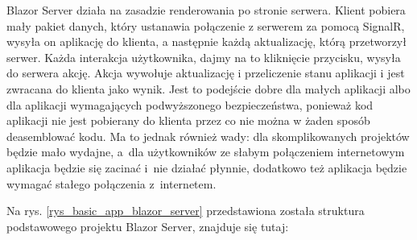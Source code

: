 \documentclass[12pt,a4paper,oneside]{book}
\begin{document}
Blazor Server działa na zasadzie renderowania po stronie serwera. Klient pobiera mały pakiet danych, który ustanawia połączenie z serwerem za pomocą SignalR, wysyła on aplikację do klienta, a następnie każdą aktualizację, którą przetworzył serwer. Każda interakcja użytkownika, dajmy na to kliknięcie przycisku, wysyła do serwera akcję. Akcja wywołuje aktualizację i przeliczenie stanu aplikacji i jest zwracana do klienta jako wynik. Jest to podejście dobre dla małych aplikacji albo dla aplikacji wymagających podwyższonego bezpieczeństwa, ponieważ kod aplikacji nie jest pobierany do klienta przez co nie można w żaden sposób deasemblować kodu. Ma to jednak również wady: dla skomplikowanych projektów będzie mało wydajne, a~dla użytkowników ze słabym połączeniem internetowym aplikacja będzie się zacinać i~nie działać płynnie, dodatkowo też aplikacja będzie wymagać stałego połączenia z~internetem.

Na rys. \ref{rys_basic_app_blazor_server} przedstawiona została struktura podstawowego projektu Blazor Server, znajduje się tutaj:
\end{document}
